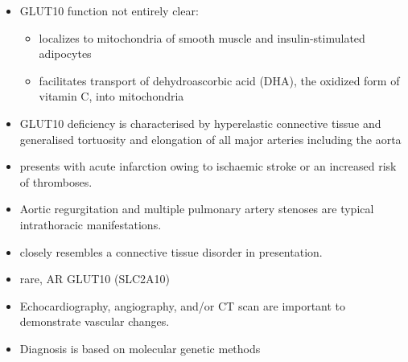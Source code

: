 \documentclass{scrartcl}
\begin{document}
\begin{itemize}
\item GLUT10 function not entirely clear:
\begin{itemize}
\item localizes to mitochondria of smooth muscle and insulin-stimulated adipocytes
\item facilitates transport of dehydroascorbic acid (DHA), the
oxidized form of vitamin C, into mitochondria
\end{itemize}

\item GLUT10 deficiency is characterised by hyperelastic connective tissue
and generalised tortuosity and elongation of all major arteries
including the aorta

\item presents with acute infarction owing to ischaemic stroke or an
increased risk of thromboses.
\item Aortic regurgitation and multiple pulmonary artery stenoses are
typical intrathoracic manifestations.
\item closely resembles a connective tissue disorder in presentation.

\item rare, AR GLUT10 (SLC2A10)
\item Echocardiography, angiography, and/or CT scan are important to demonstrate vascular changes.
\item Diagnosis is based on molecular genetic methods
\end{itemize}
\end{document}
